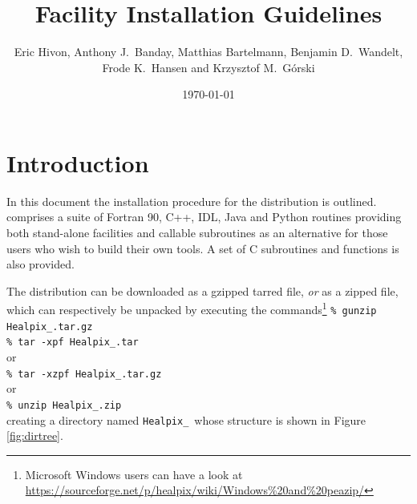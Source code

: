 \documentclass[12pt,twoside]{article}
\begin{document}
\title{\healpix Facility Installation Guidelines}
\author{Eric Hivon, Anthony J.~Banday, Matthias Bartelmann, Benjamin D.~Wandelt,
Frode K.~Hansen and Krzysztof M.~G\'orski}
%
\date{\today}

\frontpage
\tableofcontents
\newpage

\section{Introduction}

In this document the installation procedure for the \healpix
distribution is outlined. \healpix comprises a suite of Fortran 90, C++, 
IDL, Java and Python routines
providing both stand-alone facilities and callable subroutines as an alternative
for those users who wish to build their own tools.
A set of C subroutines and functions is also provided. 

The distribution can be downloaded as a gzipped tarred file, {\em or} as a zipped file,
which can respectively be unpacked by executing the commands\footnote{Microsoft Windows users can have a look at \\
\url{https://sourceforge.net/p/healpix/wiki/Windows\%20and\%20peazip/}} \hfill\newline
\texttt{\% gunzip Healpix\_\hpxversion.tar.gz}\hfill\\
\texttt{\% tar -xpf Healpix\_\hpxversion.tar}\hfill\\
or \hfill\\
\texttt{\% tar -xzpf Healpix\_\hpxversion.tar.gz}\hfill\\
or \hfill\\
\texttt{\% unzip Healpix\_\hpxversion.zip}\hfill\\
creating a directory named \texttt{Healpix\_\hpxversion}\ whose structure is shown in Figure
\ref{fig:dirtree}.
\end{document}

